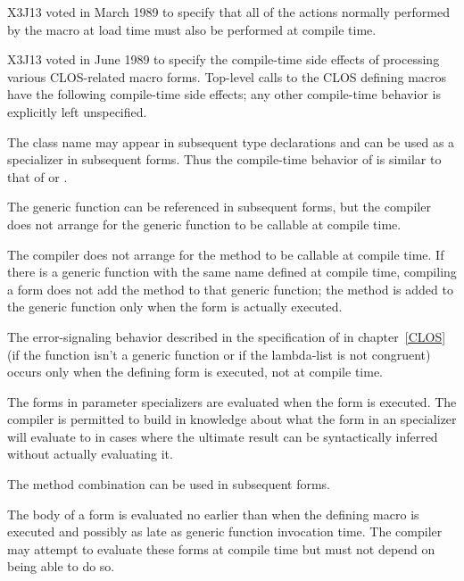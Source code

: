 \begin{newer}
\begin{flushdesc}
\item[\cd{in-package}]

X3J13 voted in March 1989  to specify that
all of the actions normally performed by the  macro at load
time must also be performed at compile time.
\end{flushdesc}

X3J13 voted in June 1989 
to specify the compile-time side effects of processing various CLOS-related
macro forms.  Top-level calls to the CLOS defining macros have the
 following compile-time side effects; any other compile-time behavior
 is explicitly left unspecified.

\begin{flushdesc}
\item[\cd{defclass}]
The class name may appear in subsequent type declarations and
can be used as a specializer in subsequent  forms.
Thus the compile-time behavior of  is similar to that of
 or .

\item[\cd{defgeneric}]
The generic function can be referenced in subsequent  forms,
but the compiler does not arrange for the generic function to be callable
    at compile time.

\item[\cd{defmethod}]  
The compiler does not arrange for the method to be callable at compile
    time.  If there is a generic function with the same name defined at
    compile time, compiling a  form does not add the method to that 
    generic function; the method is added to the generic
    function only when the  form is actually executed.

    The error-signaling behavior described in the specification of
     in chapter~\ref{CLOS} (if the function isn't a generic function
    or if the lambda-list is not congruent) occurs only when the defining
    form is executed, not at compile time.

    The forms in  parameter specializers are evaluated when the 
    form is executed.  The compiler is permitted to build in knowledge
    about what the form in an  specializer will evaluate to in cases
    where the ultimate result can be syntactically inferred without
    actually evaluating it.

\item[\cd{define-method-combination}]
The method combination can be used in subsequent  forms.  

    The body of a  form is evaluated no earlier 
    than when the defining macro is executed and possibly as late as 
    generic function invocation time.  The compiler may attempt to
    evaluate these forms at compile time but must not depend on being able
    to do so.
\end{flushdesc}
\end{newer}




